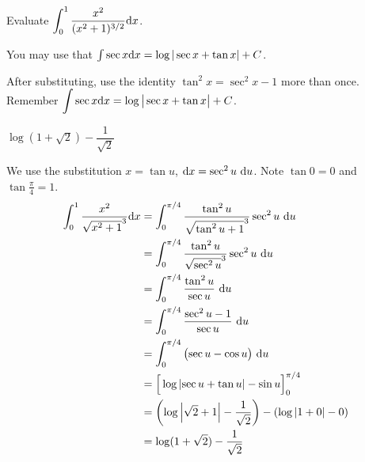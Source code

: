 \begin{question}
Evaluate $\displaystyle\int_0^1\dfrac{x^2}{(x^2+1)^{3/2}}\mathrm{d}x$.

You may use that  $\int \sec x\mathrm{d}x = \log|\sec x+\tan x| +C$.
\end{question}
\begin{hint}
After substituting, use the identity $\tan^2 x = \sec^2 x - 1$ more than once.\\
 Remember $\displaystyle\int \sec x \mathrm{d}x = \log \big|\sec x + \tan x \big|+C$.
\end{hint}
\begin{answer}
$\log(1+\sqrt{2})-\dfrac{1}{\sqrt{2}}$
\end{answer}
\begin{solution}
We use the substitution $x=\tan u$, $\mathrm{d}x=\sec^2 u~\mathrm{d}u$. Note $\tan 0=0$ and $\tan \frac{\pi}{4} =1$.
\begin{align*}
\displaystyle\int_0^1\dfrac{x^2}{\sqrt{x^2+1}^3}\mathrm{d}x&=
\int_0^{\pi/4}\dfrac{\tan^2 u}{\sqrt{\tan^2 u +1}^3}\sec^2u~\mathrm{d}u\\
&=
\int_0^{\pi/4}\dfrac{\tan^2 u}{\sqrt{\sec^2u}^3}\sec^2u~\mathrm{d}u\\
&=
\int_0^{\pi/4}\frac{\tan^2 u}{\sec u}~\mathrm{d}u\\&=
\int_0^{\pi/4}\frac{\sec^2 u-1}{\sec u}~\mathrm{d}u\\&=
\int_0^{\pi/4}\big({\sec u}-\cos u\big)~\mathrm{d}u\\
&=\Big[\log\left|\sec u + \tan u \right| - \sin u\Big]_{0}^{\pi/4}
\\
&=\left(\log\left|\sqrt{2} + 1 \right| -\frac{1}{\sqrt{2}}\right) -
\left(\log|1+0|-0\right)\\
&=\log(1+\sqrt{2})-\frac{1}{\sqrt{2}}
\end{align*}
\end{solution}


